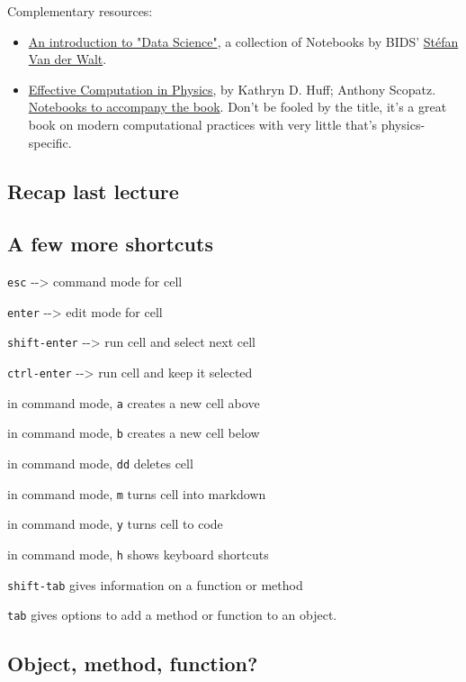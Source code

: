 \documentclass[11pt]{article}
\begin{document}
Complementary resources:

\begin{itemize}
\item
  \href{https://github.com/stefanv/ds_intro}{An introduction to "Data
  Science"}, a collection of Notebooks by BIDS'
  \href{https://bids.berkeley.edu/people/st\%C3\%A9fan-van-der-walt}{Stéfan
  Van der Walt}.
\item
  \href{http://proquest.safaribooksonline.com/book/physics/9781491901564}{Effective
  Computation in Physics}, by Kathryn D. Huff; Anthony Scopatz.
  \href{https://github.com/physics-codes/seminar}{Notebooks to accompany
  the book}. Don't be fooled by the title, it's a great book on modern
  computational practices with very little that's physics-specific.
\end{itemize}

    \subsection{Recap last lecture}\label{recap-last-lecture}

    \subsection{A few more shortcuts}\label{a-few-more-shortcuts}

\texttt{esc} -\/-\textgreater{} command mode for cell

\texttt{enter} -\/-\textgreater{} edit mode for cell

\texttt{shift-enter} -\/-\textgreater{} run cell and select next cell

\texttt{ctrl-enter} -\/-\textgreater{} run cell and keep it selected

in command mode, \texttt{a} creates a new cell above

in command mode, \texttt{b} creates a new cell below

in command mode, \texttt{dd} deletes cell

in command mode, \texttt{m} turns cell into markdown

in command mode, \texttt{y} turns cell to code

in command mode, \texttt{h} shows keyboard shortcuts

\texttt{shift-tab} gives information on a function or method

\texttt{tab} gives options to add a method or function to an object.

    \subsection{Object, method, function?}\label{object-method-function}
\end{document}
